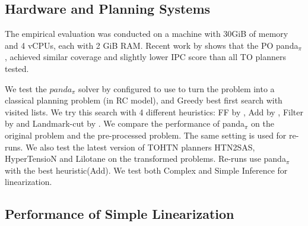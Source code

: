 \documentclass[letterpaper]{article} %
\begin{document}
\subsection{Hardware and Planning Systems}
The empirical evaluation was conducted on a machine with 30GiB of memory and 4 vCPUs, each with 2 GiB RAM. Recent work by \cite{HTN2SAS} shows that the PO panda$_\pi$, achieved similar coverage and slightly lower IPC score than all TO planners tested. %

We test the $panda_{\pi}$ solver by \cite{useClassicalHuristicICAPS18,useClassicalHeuristicIJCAI19,progressionsearchJAIR20} configured to use to turn the problem into a classical planning problem (in RC model), and Greedy best first search with visited lists. We try this search with 4 different heuristics: FF by \cite{FF}, Add by \cite{Add}, Filter by \cite{useClassicalHuristicICAPS18} and Landmark-cut by \cite{LM-Cut}. We compare the performance of panda$_\pi$ on the original problem and the pre-processed problem. The same setting is used for re-runs. We also test the latest version of TOHTN planners HTN2SAS, HyperTensioN and Lilotane on the transformed problems. Re-runs use panda$_{\pi}$ with the best heuristic(Add). 
We test both Complex and Simple Inference for linearization. %

\subsection{Performance of Simple Linearization}
\end{document}
